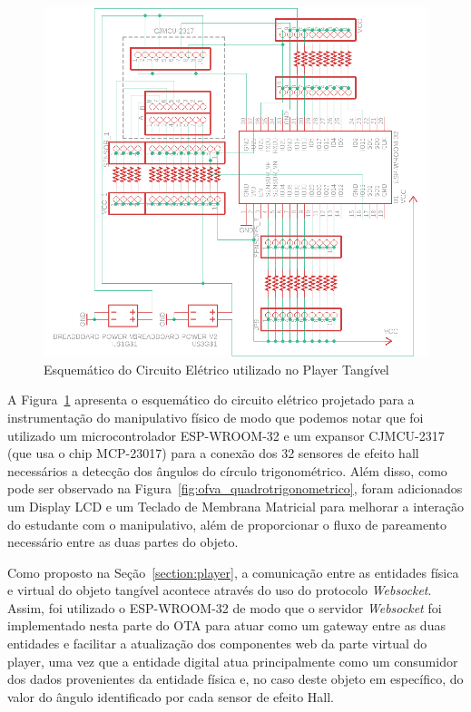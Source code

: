 \begin{figure}[htb]
	\centering
	\includegraphics[width=0.9\linewidth]{chapters/proposedMethod/tools/OFVA_FISICO_SENSORES.png}
	\caption{Esquemático do Circuito Elétrico utilizado no Player Tangível}
	\label{fig:ofva_fisico_sensores}
\end{figure}

A Figura~\ref{fig:ofva_fisico_sensores} apresenta o esquemático do circuito elétrico projetado para a instrumentação do manipulativo físico de modo que podemos notar que foi utilizado um microcontrolador ESP-WROOM-32 e um expansor CJMCU-2317 (que usa o chip MCP-23017) para a conexão dos 32 sensores de efeito hall necessários a detecção dos ângulos do círculo trigonométrico. Além disso, como pode ser observado na Figura~\ref{fig:ofva_quadrotrigonometrico}, foram adicionados um Display LCD e um Teclado de Membrana Matricial para melhorar a interação do estudante com o manipulativo, além de proporcionar o fluxo de pareamento necessário entre as duas partes do objeto.

Como proposto na Seção~\ref{section:player}, a comunicação entre as entidades física e virtual do objeto tangível acontece através do uso do protocolo \textit{Websocket}. Assim, foi utilizado o ESP-WROOM-32 de modo que o servidor \textit{Websocket} foi implementado nesta parte do OTA para atuar como um gateway entre as duas entidades e facilitar a atualização dos componentes web da parte virtual do player, uma vez que a entidade digital atua principalmente como um consumidor dos dados provenientes da entidade física e, no caso deste objeto em específico, do valor do ângulo identificado por cada sensor de efeito Hall.

